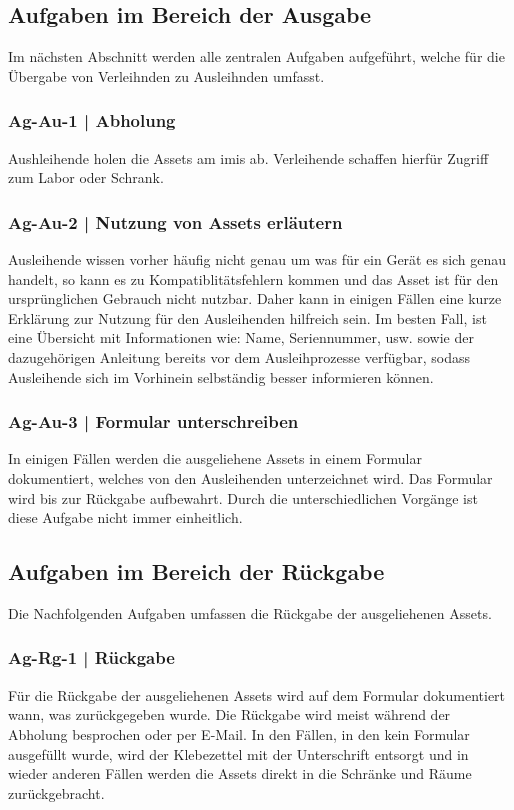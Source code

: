 \subsection{Aufgaben im Bereich der Ausgabe}
Im nächsten Abschnitt werden alle zentralen Aufgaben aufgeführt, welche für die Übergabe von
Verleihnden zu Ausleihnden umfasst.
\subsubsection{Ag-Au-1 | Abholung}
Aushleihende holen die Assets am \ac{imis} ab. Verleihende schaffen hierfür Zugriff zum Labor oder
Schrank. 
\subsubsection{Ag-Au-2 | Nutzung von Assets erläutern}
Ausleihende wissen vorher häufig nicht genau um was für ein Gerät es sich genau handelt, so kann es
zu Kompatiblitätsfehlern kommen und das Asset ist für den ursprünglichen Gebrauch nicht nutzbar. Daher
kann in einigen Fällen eine kurze Erklärung zur Nutzung für den Ausleihenden hilfreich sein. Im
besten Fall, ist eine Übersicht mit Informationen wie: Name, Seriennummer, usw. sowie der dazugehörigen
Anleitung bereits vor dem Ausleihprozesse verfügbar, sodass Ausleihende sich im Vorhinein selbständig
besser informieren können.
\subsubsection{Ag-Au-3 | Formular unterschreiben}
In einigen Fällen werden die ausgeliehene Assets in einem Formular dokumentiert, welches von den
Ausleihenden unterzeichnet wird. Das Formular wird bis zur Rückgabe aufbewahrt. Durch die
unterschiedlichen Vorgänge ist diese Aufgabe nicht immer einheitlich.

\subsection{Aufgaben im Bereich der Rückgabe}
Die Nachfolgenden Aufgaben umfassen die Rückgabe der ausgeliehenen Assets. 

\subsubsection{Ag-Rg-1 | Rückgabe}
Für die Rückgabe der ausgeliehenen Assets wird auf dem Formular dokumentiert wann, was zurückgegeben
wurde. Die Rückgabe wird meist während der Abholung besprochen oder per E-Mail. In den Fällen, in
den kein Formular ausgefüllt wurde, wird der Klebezettel mit der Unterschrift entsorgt und in wieder
anderen Fällen werden die Assets direkt in die Schränke und Räume zurückgebracht.
